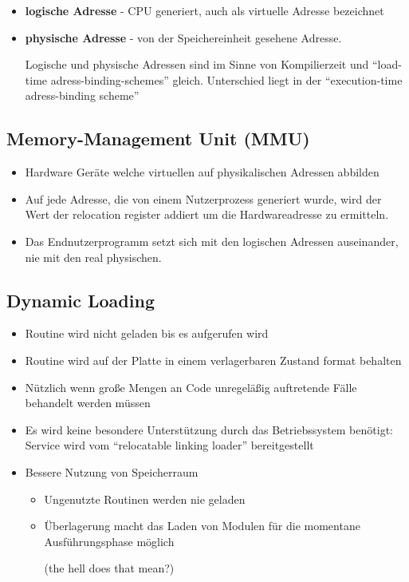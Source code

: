 \documentclass[a4paper]{scrreprt}
\begin{document}
\begin{itemize}
\item \textbf{logische Adresse} - CPU generiert, auch als virtuelle Adresse bezeichnet
\item \textbf{physische Adresse} - von der Speichereinheit gesehene Adresse.

Logische und physische Adressen sind im Sinne von Kompilierzeit und "`load-time adress-binding-schemes"' gleich. Unterschied liegt in der "`execution-time adress-binding scheme"'
\end{itemize}

\subsection{Memory-Management Unit (MMU)}
\begin{itemize}
\item Hardware Geräte welche virtuellen auf physikalischen Adressen abbilden
\item Auf jede Adresse, die von einem Nutzerprozess generiert wurde, wird der Wert der relocation register addiert um die Hardwareadresse zu ermitteln.
\item Das Endnutzerprogramm setzt sich mit den logischen Adressen auseinander, nie mit den real physischen.
\end{itemize}

\subsection{Dynamic Loading}
\begin{itemize}
\item Routine wird nicht geladen bis es aufgerufen wird
\item Routine wird auf der Platte in einem verlagerbaren Zustand format behalten
\item Nützlich wenn große  Mengen an Code unregeläßig auftretende Fälle behandelt werden müssen
\item Es wird keine besondere Unterstützung durch das Betriebssystem benötigt: Service wird vom "`relocatable linking loader"' bereitgestellt
\item Bessere Nutzung von Speicherraum
\begin{itemize}
\item Ungenutzte Routinen werden nie geladen
\item Überlagerung macht das Laden von Modulen für die momentane Ausführungsphase möglich \begin{tiny}
(the hell does that mean?)
\end{tiny}
\end{itemize}
\end{itemize}
\end{document}
